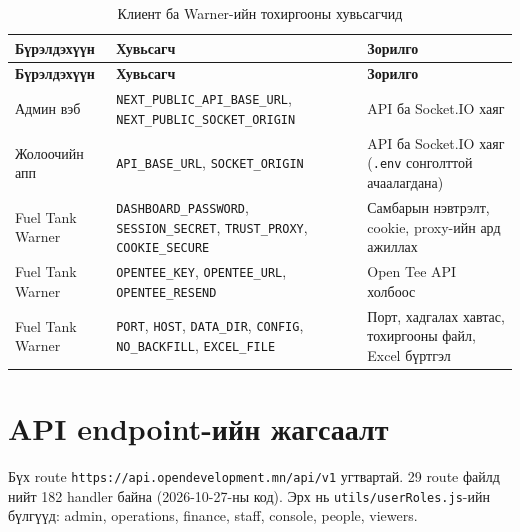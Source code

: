 \documentclass[
12pt,
oneside,
english,
onehalfspacing,
nolistspacing,
headsepline,
]{MUST-Thesis}
\begin{document}
{\small
\renewcommand{\arraystretch}{1.15}
\begin{longtable}{|L{3.6cm}|L{4.8cm}|L{5.4cm}|}
\caption{Клиент ба Warner-ийн тохиргооны хувьсагчид}\label{tab:app-env-clients}\\
\hline
{}\textbf{Бүрэлдэхүүн} & \textbf{Хувьсагч} & \textbf{Зорилго} \\ \hline
\endfirsthead
\hline
{}\textbf{Бүрэлдэхүүн} & \textbf{Хувьсагч} & \textbf{Зорилго} \\ \hline
\endhead
Админ вэб & \texttt{NEXT\_PUBLIC\_API\_BASE\_URL}, \texttt{NEXT\_PUBLIC\_SOCKET\_ORIGIN} & API ба Socket.IO хаяг \\ \hline
Жолоочийн апп & \texttt{API\_BASE\_URL}, \texttt{SOCKET\_ORIGIN} & API ба Socket.IO хаяг (\texttt{.env} сонголттой ачаалагдана) \\ \hline
Fuel Tank Warner & \texttt{DASHBOARD\_PASSWORD}, \texttt{SESSION\_SECRET}, \texttt{TRUST\_PROXY}, \texttt{COOKIE\_SECURE} & Самбарын нэвтрэлт, cookie, proxy-ийн ард ажиллах \\ \hline
Fuel Tank Warner & \texttt{OPENTEE\_KEY}, \texttt{OPENTEE\_URL}, \texttt{OPENTEE\_RESEND} & Open Tee API холбоос \\ \hline
Fuel Tank Warner & \texttt{PORT}, \texttt{HOST}, \texttt{DATA\_DIR}, \texttt{CONFIG}, \texttt{NO\_BACKFILL}, \texttt{EXCEL\_FILE} & Порт, хадгалах хавтас, тохиргооны файл, Excel бүртгэл \\ \hline
\end{longtable}
}

\section{API endpoint-ийн жагсаалт}\label{app:endpoints}

Бүх route \texttt{https://api.opendevelopment.mn/api/v1} угтвартай. 29 route файлд нийт 182 handler байна (2026-10-27-ны код). Эрх нь \texttt{utils/userRoles.js}-ийн бүлгүүд: admin, operations, finance, staff, console, people, viewers.
\end{document}
